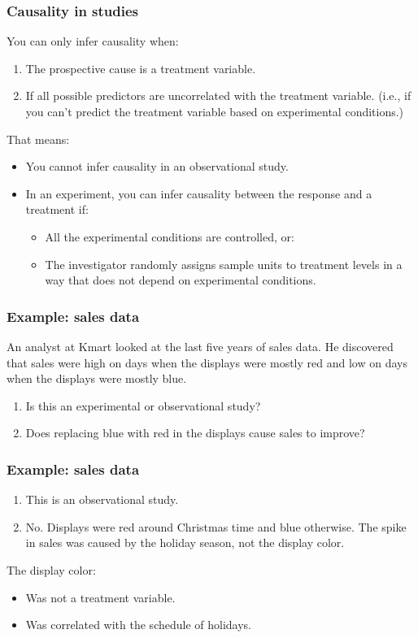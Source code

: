 \documentclass[handout]{beamer}\usepackage{graphicx, color}
\numberwithin{equation}{section}
\begin{document}
\begin{frame}
\frametitle{Causality in studies}

You can only infer causality when:
\begin{enumerate}[1. ]
\item The prospective cause is a treatment variable.
\pause \item If all possible predictors are uncorrelated with the treatment variable. \pause (i.e., if you can't predict the treatment variable based on experimental conditions.)
\end{enumerate}

\pause That means:

\begin{itemize}
\item You cannot infer causality in an observational study.
\pause \item In an experiment, you can infer causality between the response and a treatment if:
\begin{itemize}
\pause \item All the experimental conditions are controlled, or:
\pause \item The investigator randomly assigns sample units to treatment levels in a way that does not depend on experimental conditions. 
\end{itemize}
\end{itemize}
\end{frame}

\begin{frame}
\frametitle{Example: sales data}

An analyst at Kmart looked at the last five years of sales data. He discovered that sales were high on days when the displays were mostly red and low on days when the displays were mostly blue. 

\begin{enumerate}
\pause \item Is this an experimental or observational study?
\pause \item Does replacing blue with red in the displays cause sales to improve?
\end{enumerate}

\end{frame}

\begin{frame}
\frametitle{Example: sales data}

\begin{enumerate}[1. ]
\item This is an observational study.
\pause \item No. Displays were red around Christmas time and blue otherwise. The spike in sales was caused by the holiday season, not the display color. 
\end{enumerate}

\pause The display color:
\begin{itemize}
\item Was not a treatment variable.
\pause \item Was correlated with the schedule of holidays.
\end{itemize}
\end{frame}
\end{document}
